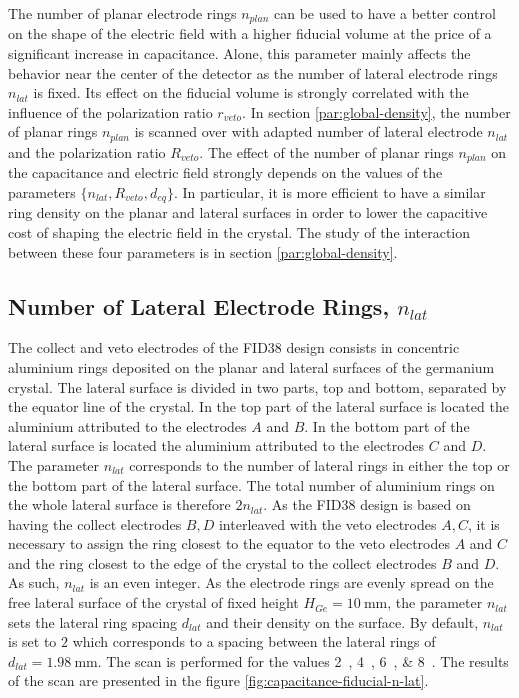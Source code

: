 The number of planar electrode rings $n_{plan}$ can be used to have a better control on the shape of the electric field with a higher fiducial volume at the price of a significant increase in capacitance. Alone, this parameter mainly affects the behavior near the center of the detector as the number of lateral electrode rings $n_{lat}$ is fixed. Its effect on the fiducial volume is strongly correlated with the influence of the polarization ratio $r_{veto}$. In section \ref{par:global-density}, the number of planar rings $n_{plan}$ is scanned over with adapted number of lateral electrode $n_{lat}$ and the polarization ratio $R_{veto}$.
The effect of the number of planar rings $n_{plan}$ on the capacitance and electric field strongly depends on the values of the parameters $\{n_{lat}, R_{veto}, d_{eq}\}$. In particular, it is more efficient to have a similar ring density on the planar and lateral surfaces in order to lower the capacitive cost of shaping the electric field in the crystal. The study of the interaction between these four parameters is in section \ref{par:global-density}.


\subsection{Number of Lateral Electrode Rings, $n_{lat}$}
\label{par:n-lat}

The collect and veto electrodes of the FID38 design consists in concentric aluminium rings deposited on the planar and lateral surfaces of the germanium crystal. The lateral surface is divided in two parts, top and bottom, separated by the equator line of the crystal. In the top part of the lateral surface is located the aluminium attributed to the electrodes $A$ and $B$. In the bottom part of the lateral surface is located the aluminium attributed to the electrodes $C$ and $D$. The parameter $n_{lat}$ corresponds to the number of lateral rings in either the top or the bottom part of the lateral surface. The total number of aluminium rings on the whole lateral surface is therefore $2 n_{lat}$. As the FID38 design is based on having the collect electrodes $B,D$ interleaved with the veto electrodes $A,C$, it is necessary to assign the ring closest to the equator to the veto electrodes $A$ and $C$ and the ring closest to the edge of the crystal to the collect electrodes $B$ and $D$. As such, $n_{lat}$ is an even integer. As the electrode rings are evenly spread on the free lateral surface of the crystal of fixed height $H_{Ge}=\SI{10}{\mm}$, the parameter $n_{lat}$ sets the lateral ring spacing $d_{lat}$ and their density on the surface. By default, $n_{lat}$ is set to $2$ which corresponds to a spacing between the lateral rings of $d_{lat}=\SI{1.98}{\mm}$.  The scan is performed for the values \SIlist{2; 4; 6; 8}{}. The results of the scan are presented in the figure \ref{fig:capacitance-fiducial-n-lat}.


